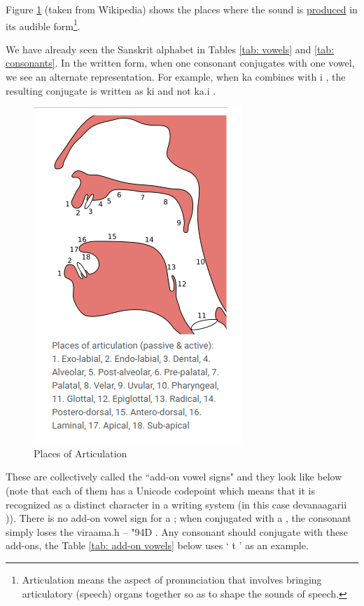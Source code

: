 \documentclass[a4paper, 12pt]{article}
\newcommand \sans[1]{
    \textsanskrit{#1}
}
\begin{document}
Figure \ref{fig: places-of-articulation} (taken from Wikipedia) shows the places where the sound is \href{https://en.wikipedia.org/wiki/Place_of_articulation}{produced} in its audible form\footnote{Articulation means the aspect of pronunciation that involves bringing articulatory (speech) organs together so as to shape the sounds of speech.}.

We have already seen the Sanskrit alphabet in Tables \ref{tab: vowels} and \ref{tab: consonants}. In the written form, when one consonant conjugates with one vowel, we see an alternate representation. For example, when \sans{ka} combines with \sans{i}, the resulting conjugate is written as \sans{ki} and not \sans{ka.i}.
\begin{figure}[htbp!]
    \centering
    \includegraphics[width=0.3\linewidth]{places-of-articulation.png}
    \caption{Places of Articulation}
    \label{fig: places-of-articulation}
\end{figure}

These are collectively called the ``add-on vowel signs" and they look like below (note that each of them has a Unicode codepoint which means that it is recognized as a distinct character in a writing system (in this case \sans{devanaagarii})). There is no add-on vowel sign for \sans{a}; when conjugated with \sans{a}, the consonant simply loses the \sans{viraama.h} -- \sans{\char"94D}. Any consonant should conjugate with these add-ons, the Table \ref{tab: add-on vowels} below uses `\sans{t}' as an example.
\end{document}

